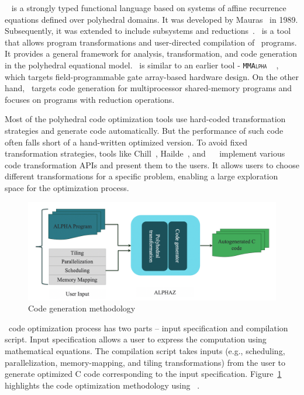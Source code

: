 \alfa~\cite{Mauras1989} is a strongly typed functional language based on
systems of affine recurrence equations defined over polyhedral domains. It was developed by Mauras~\cite{Mauras1989}  in 1989.  Subsequently, it was extended to include subsystems and reductions~\cite{leverge-thesis, leverge-parle92, fdupont-asap96, florent-thesis, DupontQuRi93}. \alphaz\ is a tool that allows program transformations and user-directed compilation of \alfa\ programs.  It provides a general framework for analysis, transformation, and code generation in the polyhedral equational model.  \alphaz\ is similar to an earlier tool - \textsc{\texttt{MMAlpha}} ~\cite{guillou-mma} , which targets field-programmable gate array-based hardware design. On the other hand, \alphaz\ targets code generation for multiprocessor shared-memory programs and focuses on programs with reduction operations. 


Most of the polyhedral code optimization tools use hard-coded transformation strategies and generate code automatically. But the performance of such code often falls short of a hand-written optimized version. To avoid fixed transformation strategies, tools like Chill~\cite{Chen08chill:a}, Hailde~\cite{RaganKelley2013}, and \alphaz\ ~\cite{sanjay-lcpc2012} implement various code transformation APIs and present them to the users. It allows users to choose different transformations for a specific problem, enabling a large exploration space for the optimization process.

\begin{figure}[htbp]
\centerline{\includegraphics[scale=0.35,trim=5 5 5 5,clip]{content/figures/code_generation_methodology.png}}
\caption{Code generation methodology}
\label{fig:code_gen_methodlogy}
\end{figure}
\alphaz\ code optimization process has two parts – input specification and compilation script.  Input specification allows a user to express the computation using mathematical equations. The compilation script takes inputs (e.g., scheduling, parallelization, memory-mapping, and tiling transformations) from the user to generate optimized C code corresponding to the input specification. Figure~\ref{fig:code_gen_methodlogy} highlights the code optimization methodology using \alphaz\ .  


